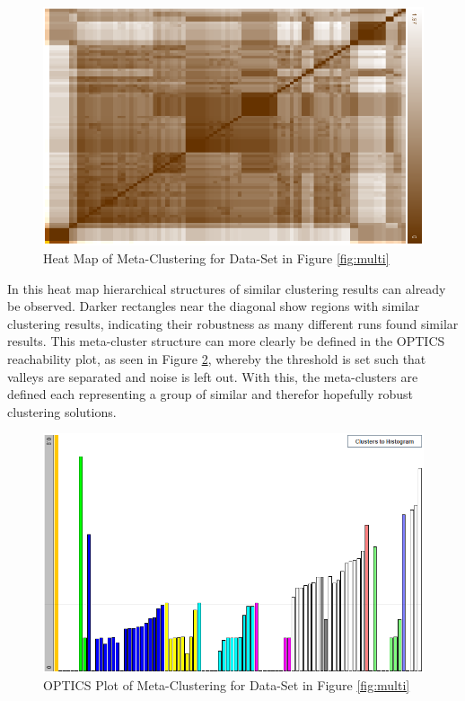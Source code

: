 \documentclass[
	a4paper,
	english,
	twoside,
	openright,               
	11pt                            
	]{report}
\begin{document}
\begin{figure}[h]
	\centering
	\includegraphics[scale=.4]{multi_heatmap}
	\caption{Heat Map of Meta-Clustering for Data-Set in Figure \ref{fig:multi}}
	\label{fig:multi_heatmap}
\end{figure}

In this heat map hierarchical structures of similar clustering results can already be observed. Darker rectangles near the diagonal show regions with similar clustering results, indicating their robustness as many different runs found similar results. This meta-cluster structure can more clearly be defined in the OPTICS reachability plot, as seen in Figure \ref{fig:multi_optics}, whereby the threshold is set such that valleys are separated and noise is left out. With this, the meta-clusters are defined each representing a group of similar and therefor hopefully robust clustering solutions.

\begin{figure}[h]
	\centering
	\includegraphics[scale=.4]{multi_optics}
	\caption{OPTICS Plot of Meta-Clustering for Data-Set in Figure \ref{fig:multi}}
	\label{fig:multi_optics}
\end{figure}
\end{document}
